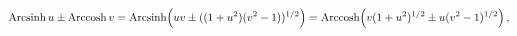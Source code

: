 \[\mathop{\mathrm{Arcsinh}\/}\nolimits u\pm\mathop{\mathrm{Arccosh}\/}\nolimits v%
=\mathop{\mathrm{Arcsinh}\/}\nolimits\!\left(uv\pm((1+u^{2})(v^{2}-1))^{1/2}%
\right)=\mathop{\mathrm{Arccosh}\/}\nolimits\!\left(v(1+u^{2})^{1/2}\pm u(v^{2%
}-1)^{1/2}\right),\]